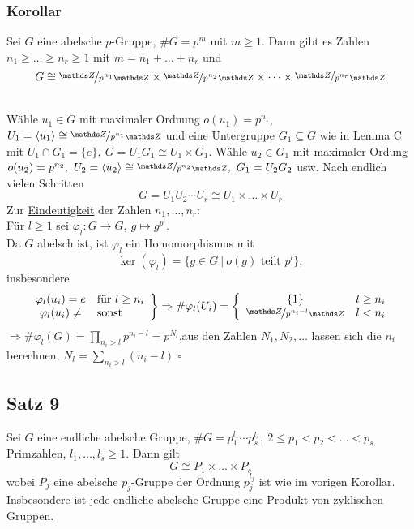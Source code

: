 \subsubsection*{Korollar}
Sei $G$ eine abelsche $p$-Gruppe, $\#G=p^m$ mit $m\ge 1$. Dann gibt es Zahlen $n_1\ge \dots \ge n_r\ge 1$ mit $m=n_1+\dots+n_r$ und \[ G\cong \nicefrac{\Z}{p^{n_1}\Z} \times \nicefrac{\Z}{p^{n_2}\Z} \times \dots \times \nicefrac{\Z}{p^{n_r}\Z} \]

\\
Wähle $u_1\in G$ mit maximaler Ordnung $o(u_1)=p^{n_1}$, $U_1=\lh{u_1}\cong \nicefrac{\Z}{p^{n_1}\Z}$ und eine Untergruppe $G_1\subseteq G$ wie in Lemma C mit $U_1\cap G_1=\{e\},~G=U_1G_1\cong U_1\times G_1$. Wähle $u_2\in G_1$ mit maximaler Ordung $o(u_2)=p^{n_2}, ~U_2=\lh{u_2}\cong \nicefrac{\Z}{p^{n_2}\Z},~ G_1=U_2G_2$ usw. Nach endlich vielen Schritten \[G=U_1U_2\cdots U_r\cong U_1\times \dots \times U_r \]
Zur \uline{Eindeutigkeit} der Zahlen $n_1,\dots,n_r$:\\
Für $l\ge 1$ sei $\varphi_l:G\to G,~g\mapsto g^{p^l}$.\\
Da $G$ abelsch ist, ist $\varphi_l$ ein Homomorphismus mit \[\ker(\varphi_l)=\{g\in G~|~o(g)\text{ teilt }p^l\}, \]
insbesondere
\[ \left.\begin{array}{cl} \varphi_l(u_i)=e & \text{für } l\ge n_i\\ \varphi_l(u_i)\not= & \text{sonst}    \end{array}\right\}\Rightarrow \#\varphi_l(U_i)=\left\{\begin{array}{cl} \{1\} & l\ge n_i\\ \nicefrac{\Z}{p^{n_i-l}\Z} & l<n_i    \end{array}\right. \]
$\Rightarrow \#\varphi_l(G)=\prod_{n_i>l}p^{n_i-l}=p^{N_l}$,aus den Zahlen $N_1,N_2,\dots$ lassen sich die $n_i$ berechnen, $N_l=\sum_{n_i>l}(n_i-l)$
\hfill $\square$

\subsection{Satz 9}
\label{sub:satz_9}
Sei $G$ eine endliche abelsche Gruppe, $\#G=p_1^{l_1}\cdots p_s^{l_s},~ 2\le p_1<p_2<\dots<p_s$ Primzahlen, $l_1,\dots,l_s\ge 1$. Dann gilt \[G\cong P_1\times \dots\times P_s \]
wobei $P_j$ eine abelsche $p_j$-Gruppe der Ordnung $p_j^{l_j}$ ist wie im vorigen Korollar.\\
Insbesondere ist jede endliche abelsche Gruppe eine Produkt von zyklischen Gruppen.\\
\newpage


